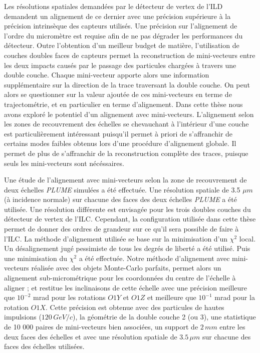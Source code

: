 Les r\'esolutions spatiales demand\'ees par le détecteur de vertex de l'ILD demandent un alignement de ce dernier avec une pr\'ecision sup\'erieure \`a la pr\'ecision intrins\`eque des capteurs utilis\'es. Une pr\'ecision sur l'alignement de l'ordre du microm\`etre est requise afin de ne pas d\'egrader les performances du détecteur. Outre l'obtention d'un meilleur budget de mati\`ere, l'utilisation de couches doubles faces de capteurs permet la reconstruction de mini-vecteurs entre les deux impacts caus\'es par le passage des particules charg\'ees \`a travers une double couche. Chaque mini-vecteur apporte alors une information suppl\'ementaire sur la direction de la trace traversant la double couche. On peut alors se questionner sur la valeur ajout\'ee de ces mini-vecteurs en terme de trajectom\'etrie, et en particulier en terme d'alignement. Dans cette th\`ese nous avons explor\'e le potentiel d'un alignement avec mini-vecteurs. L'alignement selon les zones de recouvrement des \'echelles se chevauchant \`a l'int\'erieur d'une couche est particuli\`erement int\'eressant puisqu'il permet \`a priori de s'affranchir de certains modes faibles obtenus lors d'une proc\'edure d'alignement globale. Il permet de plus de s'affranchir de la reconstruction compl\`ete des traces, puisque seuls les mini-vecteurs sont n\'ec\'essaires.

\medskip

Une \'etude de l'alignement avec mini-vecteurs selon la zone de recouvrement de deux \'echelles \textit{PLUME} simul\'ees a \'et\'e effectu\'ee. Une r\'esolution spatiale de 3.5 $\mu m$ (\`a incidence normale) sur chacune des faces des deux \'echelles \textit{PLUME} a \'et\'e utilis\'ee. Une r\'esolution diff\'erente est envisag\'ee pour les trois doubles couches du d\'etecteur de vertex de l'ILC. Cependant, la configuration utilis\'ee dans cette th\`ese permet de donner des ordres de grandeur sur ce qu'il sera possible de faire \`a l'ILC. La m\'ethode d'alignement utilis\'ee se base sur la minimisation d'un $\chi^2$ local. Un d\'esalignement jug\'e pessimiste de tous les degr\'es de libert\'e a \'et\'e utilis\'e. Puis une minimisation du $\chi^2$ a \'et\'e effectu\'ee. Notre m\'ethode d'alignement avec mini-vecteurs r\'ealis\'ee avec des objets Monte-Carlo parfaits, permet alors un alignement sub-microm\'etrique pour les coordonn\'ees du centre de l'\'echelle \`a aligner ; et restitue les inclinaisons de cette \'echelle avec une pr\'ecision meilleure que $10^{-2}$ mrad pour les rotations $O1Y$ et $O1Z$ et meilleure que $10^{-1}$ mrad pour la rotation $O1X$. Cette pr\'ecision est obtenue avec des particules de hautes impulsions ($120 \, GeV/c$), la g\'eom\'etrie de la double couche 2 (ou 3), une statistique de 10 000 paires de mini-vecteurs bien associ\'ees, un support de $2 \, mm$ entre les deux faces des \'echelles et avec une r\'esolution spatiale de $3.5 \, \mu m$ sur chacune des faces des \'echelles utilis\'ees.

